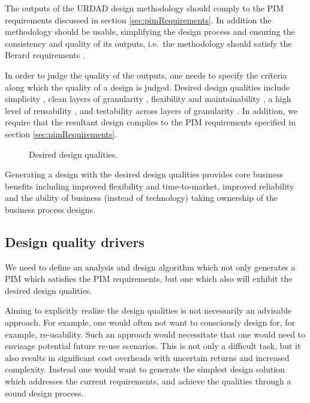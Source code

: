 \documentclass[reviewcopy]{elsart}
\begin{document}
The outputs of the URDAD design methodology should comply to the PIM
requirements discussed in section \ref{sec:pimRequirements}. In addition the
methodology should be usable, simplifying the design
process and ensuring the consistency and quality of its outputs,
i.e.\ the methodology should satisfy the Berard requirements
\cite{berard:whatIsMethodology}.

In order to judge the quality of the outputs, one needs to specify the criteria
along which the quality of a design is judged.
Desired design qualities include simplicity
\cite{wirfs-brock:designSimplicity}, clean layers of granularity
\cite{martin:agileSoftwareDevelopment, artus:soaRealization},
flexibility and maintainability
\cite{hordijk:maintainabilityFactors,misra:drivingMaintainableDesign},
a high level of reusability \cite{lenz:softwareReuse}, and
testability across layers of granularity \cite{voas:softwareTestability}. In
addition, we require that the resultant design complies to the PIM
requirements specified in section  \ref{sec:pimRequirements}.

\begin{figure}
  \centering
  \caption{Desired design qualities.}
  \label{fig:designActivities}
\end{figure}

Generating a design with the desired design qualities provides core business
benefits including improved flexibility and time-to-market,
improved reliability and the ability of business (instead of technology)
taking ownership of the business process designs.


\subsection{Design quality drivers}

We need to define an analysis and design algorithm which not only generates a
PIM which satisfies the PIM requirements, but one which also will exhibit
the desired design qualities.

Aiming to explicitly realize the design qualities is not necessarily an advisable
approach. For example,  one would often not want to
consciously design for, for example, re-usability. Such an approach would
necessitate that one would need to envisage potential future re-use scenarios.
This is not only a difficult task, but it also results in significant cost
overheads with uncertain returns and increased complexity. Instead one would want
to generate the simplest design solution which addresses the current requirements,
and achieve the qualities through a sound design process.
\end{document}

